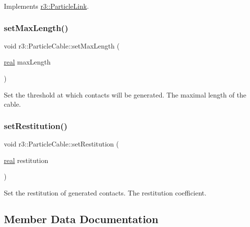 Implements \mbox{\hyperlink{classr3_1_1_particle_link_ace50b4019999af62cb9c49ddd64c7a4d}{r3\+::\+Particle\+Link}}.

\mbox{\label{classr3_1_1_particle_cable_a6cf3d6cff00fa5a7eeb1df8975cd59de}} 
\subsubsection{\texorpdfstring{set\+Max\+Length()}{setMaxLength()}}
{\footnotesize\ttfamily void r3\+::\+Particle\+Cable\+::set\+Max\+Length (\begin{DoxyParamCaption}\item[{\mbox{\hyperlink{namespacer3_ab2016b3e3f743fb735afce242f0dc1eb}{real}}}]{max\+Length }\end{DoxyParamCaption})}



Set the threshold at which contacts will be generated.  The maximal length of the cable. 

\mbox{\label{classr3_1_1_particle_cable_a070f8df68fbf2b7a7b758f1c5b22c42c}} 
\subsubsection{\texorpdfstring{set\+Restitution()}{setRestitution()}}
{\footnotesize\ttfamily void r3\+::\+Particle\+Cable\+::set\+Restitution (\begin{DoxyParamCaption}\item[{\mbox{\hyperlink{namespacer3_ab2016b3e3f743fb735afce242f0dc1eb}{real}}}]{restitution }\end{DoxyParamCaption})}



Set the restitution of generated contacts.  The restitution coefficient. 



\subsection{Member Data Documentation}
\mbox{\label{classr3_1_1_particle_cable_a168d7ed5047dc94ae73f7eec4929ab4d}} 
